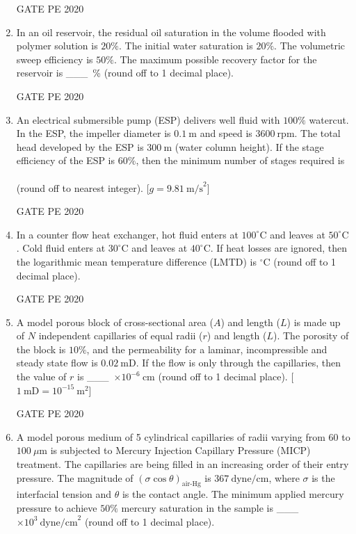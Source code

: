 \documentclass[journal,12pt,onecolumn]{IEEEtran}
\theoremstyle{remark}
\begin{document}
\begin{enumerate}
  \hfill{GATE PE 2020}

 
\item In an oil reservoir, the residual oil saturation in the volume flooded with polymer solution is $20\%$.  
The initial water saturation is $20\%$.  
The volumetric sweep efficiency is $50\%$.  
The maximum possible recovery factor for the reservoir is \_\_\_\ \% (round off to 1 decimal place).  

  \hfill{GATE PE 2020}
 
\item An electrical submersible pump (ESP) delivers well fluid with $100\%$ watercut.  
In the ESP, the impeller diameter is $0.1 \ \text{m}$ and speed is $3600 \ \text{rpm}$.  
The total head developed by the ESP is $300 \ \text{m}$ (water column height).  
If the stage efficiency of the ESP is $60\%$, then the minimum number of stages required is \\\\ (round off to nearest integer).  
[$g = 9.81 \ \text{m/s}^2$]  

  \hfill{GATE PE 2020}
 
\item In a counter flow heat exchanger, hot fluid enters at $100^\circ \text{C}$ and leaves at $50^\circ \text{C}$.  
Cold fluid enters at $30^\circ \text{C}$ and leaves at $40^\circ \text{C}$.  
If heat losses are ignored, then the logarithmic mean temperature difference (LMTD) is  $^\circ \text{C}$ (round off to 1 decimal place).  

  \hfill{GATE PE 2020}

 
\item A model porous block of cross-sectional area ($A$) and length ($L$) is made up of $N$ independent capillaries of equal radii ($r$) and length ($L$).  
The porosity of the block is $10\%$, and the permeability for a laminar, incompressible and steady state flow is $0.02 \ \text{mD}$.  
If the flow is only through the capillaries, then the value of $r$ is \_\_\_\ $\times 10^{-6} \ \text{cm}$ (round off to 1 decimal place).  
[$1 \ \text{mD} = 10^{-15} \ \text{m}^2$]  

  \hfill{GATE PE 2020}
 
\item A model porous medium of 5 cylindrical capillaries of radii varying from $60$ to $100 \ \mu\text{m}$ is subjected to Mercury Injection Capillary Pressure (MICP) treatment.  
The capillaries are being filled in an increasing order of their entry pressure.  
The magnitude of $(\sigma \cos \theta)_{\text{air-Hg}}$ is $367 \ \text{dyne/cm}$, where $\sigma$ is the interfacial tension and $\theta$ is the contact angle.  
The minimum applied mercury pressure to achieve $50\%$ mercury saturation in the sample is \_\_\_\ $\times 10^3 \ \text{dyne/cm}^2$ (round off to 1 decimal place).  


\end{enumerate}
\end{document}
